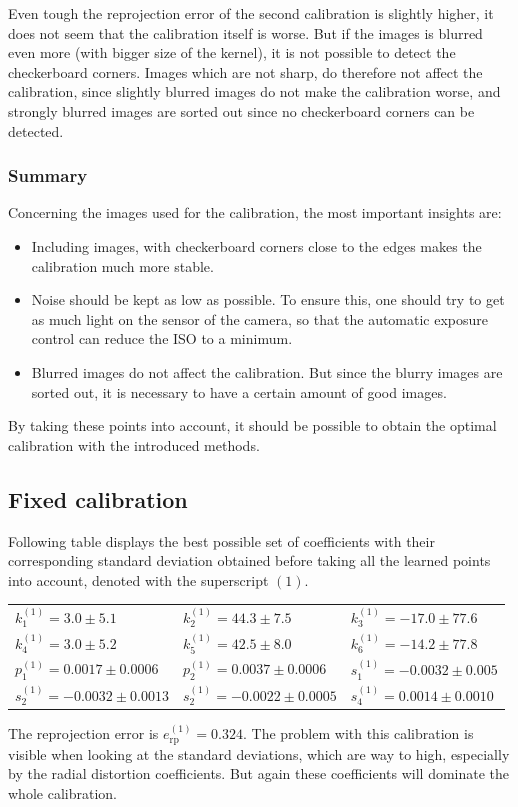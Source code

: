 Even tough the reprojection error of the second calibration is slightly higher, it does not seem that the calibration itself is worse.
But if the images is blurred even more (with bigger size of the kernel), it is not possible to detect the checkerboard corners.
Images which are not sharp, do therefore not affect the calibration, since slightly blurred images do not make the calibration worse, and strongly blurred images are sorted out since no checkerboard corners can be detected.

\subsubsection{Summary}
Concerning the images used for the calibration, the most important insights are:
\begin{itemize}
\item Including images, with checkerboard corners close to the edges makes the calibration much more stable.
\item Noise should be kept as low as possible. To ensure this, one should try to get as much light on the sensor of the camera, so that the automatic exposure control can reduce the ISO to a minimum.
\item Blurred images do not affect the calibration. But since the blurry images are sorted out, it is necessary to have a certain amount of good images.
\end{itemize}
By taking these points into account, it should be possible to obtain the optimal calibration with the introduced methods.


\subsection{Fixed calibration}
Following table displays the best possible set of coefficients with their corresponding standard deviation obtained before taking all the learned points into account, denoted with the superscript $(1)$.
\begin{center}
	\begin{tabular}{lll}
		$k_1^{(1)}=3.0\pm 5.1$&$k_2^{(1)}=44.3\pm 7.5$&$k_3^{(1)}=-17.0\pm 77.6$\\
		$k_4^{(1)}=3.0\pm 5.2$&$k_5^{(1)}=42.5\pm 8.0$&$k_6^{(1)}=-14.2\pm 77.8$\\
		$p_1^{(1)}=0.0017\pm 0.0006$&$p_2^{(1)}=0.0037\pm 0.0006$&$s_1^{(1)}=-0.0032\pm 0.005$\\
		$s_2^{(1)}=-0.0032\pm 0.0013$&$s_2^{(1)}=-0.0022\pm 0.0005$&$s_4^{(1)}=0.0014\pm 0.0010$
	\end{tabular} 
\end{center}
The reprojection error is $e_{\text{rp}}^{(1)}=0.324$.
The problem with this calibration is visible when looking at the standard deviations, which are way to high, especially by the radial distortion coefficients.
But again these coefficients will dominate the whole calibration.

